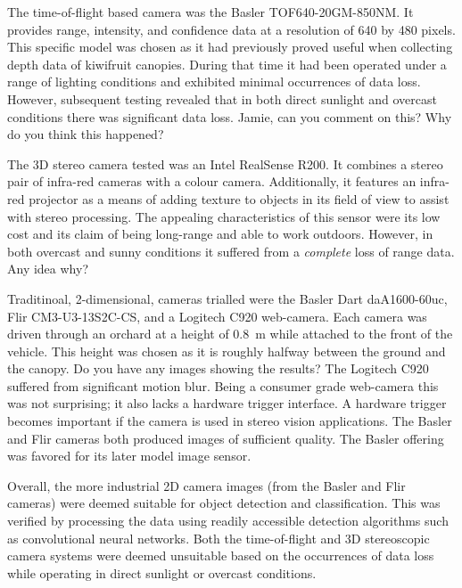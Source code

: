 \documentclass[preprint,authoryear,12pt]{elsarticle}
\begin{document}
        The time-of-flight based camera was the Basler TOF640-20GM-850NM.
        It provides range, intensity, and confidence data at a resolution of 640 by 480 pixels.
        This specific model was chosen as it had previously proved useful when collecting depth data of kiwifruit canopies.
        During that time it had been operated under a range of lighting conditions and exhibited minimal occurrences of data loss.
        However, subsequent testing revealed that in both direct sunlight and overcast conditions there was significant data loss.
        \color{red}Jamie, can you comment on this? Why do you think this happened?\color{black}

        The 3D stereo camera tested was an Intel RealSense R200.
        It combines a stereo pair of infra-red cameras with a colour camera.
        Additionally, it features an infra-red projector as a means of adding texture to objects in its field of view to assist with stereo processing.
        The appealing characteristics of this sensor were its low cost and its claim of being long-range and able to work outdoors.
        However, in both overcast and sunny conditions it suffered from a \emph{complete} loss of range data.
        \color{red}Any idea why?\color{black}

        Traditinoal, 2-dimensional, cameras trialled were the Basler Dart daA1600-60uc, Flir CM3-U3-13S2C-CS, and a Logitech C920 web-camera.
        Each camera was driven through an orchard at a height of \SI{0.8}{\meter} while attached to the front of the vehicle.
        This height was chosen as it is roughly halfway between the ground and the canopy.
        \color{red}Do you have any images showing the results?\color{black}
        The Logitech C920 suffered from significant motion blur.
        Being a consumer grade web-camera this was not surprising; it also lacks a hardware trigger interface.
        A hardware trigger becomes important if the camera is used in stereo vision applications.
        The Basler and Flir cameras both produced images of sufficient quality.
        The Basler offering was favored for its later model image sensor.

        Overall, the more industrial 2D camera images (from the Basler and Flir cameras) were deemed suitable for object detection and classification.
        This was verified by processing the data using readily accessible detection algorithms such as convolutional neural networks.
        Both the time-of-flight and 3D stereoscopic camera systems were deemed unsuitable based on the occurrences of data loss while operating in direct sunlight or overcast conditions.
\end{document}
